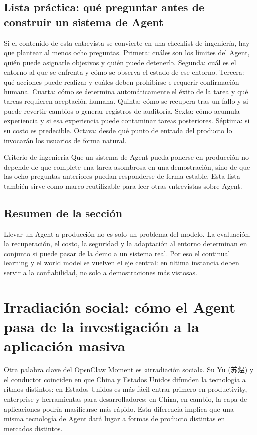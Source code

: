 \documentclass[a4paper]{article}
\begin{document}
\subsection{Lista práctica: qué preguntar antes de construir un sistema de Agent}

Si el contenido de esta entrevista se convierte en una checklist de ingeniería, hay que plantear al menos ocho preguntas. Primera: cuáles son los límites del Agent, quién puede asignarle objetivos y quién puede detenerlo. Segunda: cuál es el entorno al que se enfrenta y cómo se observa el estado de ese entorno. Tercera: qué acciones puede realizar y cuáles deben prohibirse o requerir confirmación humana. Cuarta: cómo se determina automáticamente el éxito de la tarea y qué tareas requieren aceptación humana. Quinta: cómo se recupera tras un fallo y si puede revertir cambios o generar registros de auditoría. Sexta: cómo acumula experiencia y si esa experiencia puede contaminar tareas posteriores. Séptima: si su costo es predecible. Octava: desde qué punto de entrada del producto lo invocarán los usuarios de forma natural.

\begin{importantbox}{Criterio de ingeniería}
Que un sistema de Agent pueda ponerse en producción no depende de que complete una tarea asombrosa en una demostración, sino de que las ocho preguntas anteriores puedan responderse de forma estable. Esta lista también sirve como marco reutilizable para leer otras entrevistas sobre Agent.
\end{importantbox}

\subsection{Resumen de la sección}

Llevar un Agent a producción no es solo un problema del modelo. La evaluación, la recuperación, el costo, la seguridad y la adaptación al entorno determinan en conjunto si puede pasar de la demo a un sistema real. Por eso el continual learning y el world model se vuelven el eje central: en última instancia deben servir a la confiabilidad, no solo a demostraciones más vistosas.
\section{Irradiación social: cómo el Agent pasa de la investigación a la aplicación masiva}

Otra palabra clave del OpenClaw Moment es «irradiación social». Su Yu (苏煜) y el conductor coinciden en que China y Estados Unidos difunden la tecnología a ritmos distintos: en Estados Unidos es más fácil entrar primero en productivity, enterprise y herramientas para desarrolladores; en China, en cambio, la capa de aplicaciones podría masificarse más rápido. Esta diferencia implica que una misma tecnología de Agent dará lugar a formas de producto distintas en mercados distintos.
\end{document}
